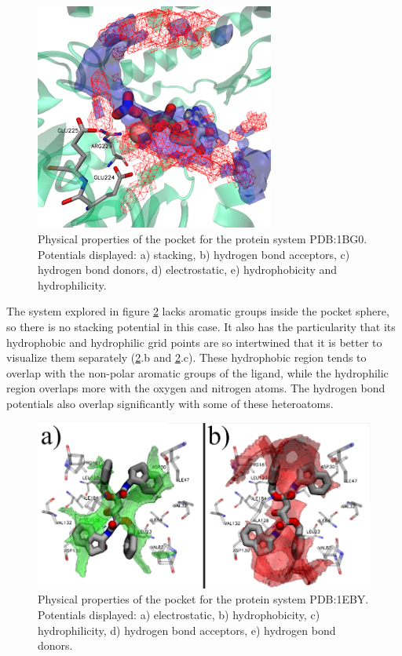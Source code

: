     \begin{figure}[H]
      \centering
      \includegraphics[width=0.7\textwidth]{figures/results/benchmark_prot/1bg0.png}
      \caption{\label{fig:benchmark/1bg0} Physical properties of the pocket for the protein system PDB:1BG0. Potentials displayed: a) stacking, b) hydrogen bond acceptors, c) hydrogen bond donors, d) electrostatic, e) hydrophobicity and hydrophilicity.}
    \end{figure}

    The system explored in figure \ref{fig:benchmark/1eby} lacks aromatic groups inside the pocket sphere, so there is no stacking potential in this case. It also has the particularity that its hydrophobic and hydrophilic grid points are so intertwined that it is better to visualize them separately (\ref{fig:benchmark/1eby}.b and \ref{fig:benchmark/1eby}.c). These hydrophobic region tends to overlap with the non-polar aromatic groups of the ligand, while the hydrophilic region overlaps more with the oxygen and nitrogen atoms. The hydrogen bond potentials also overlap significantly with some of these heteroatoms.

    \begin{figure}[H]
      \centering
      \includegraphics[width=1\textwidth]{figures/results/benchmark_prot/1eby.png}
      \caption{\label{fig:benchmark/1eby} Physical properties of the pocket for the protein system PDB:1EBY. Potentials displayed: a) electrostatic, b) hydrophobicity, c) hydrophilicity, d) hydrogen bond acceptors, e) hydrogen bond donors.}
    \end{figure}

